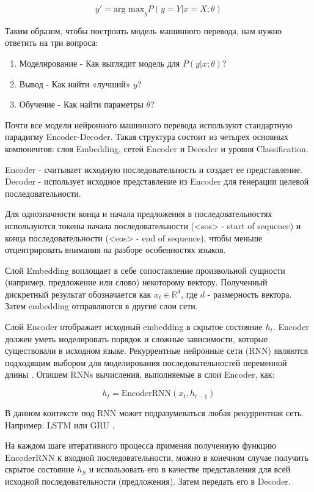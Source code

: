 \documentclass[a4paper,12pt]{article}
\begin{document}
    $$
        y' = \text{arg max}_y P(y = Y | x = X; \theta)
    $$
    
    Таким образом, чтобы построить модель машинного перевода, нам нужно ответить на три вопроса:
    
    \begin{enumerate}
        \item Моделирование - Как выглядит модель для $P(y|x; \theta)$?
        \item Вывод - Как найти «лучший» $y$?
        \item Обучение - Как найти параметры $\theta$?
    \end{enumerate}
    
    Почти все модели нейронного машинного перевода используют стандартную парадигму Encoder-Decoder. Такая структура состоит из четырех основных компонентов: слоя Embedding, сетей Encoder и Decoder и уровня Classification.
    
    Encoder - считывает исходную последовательность и создает ее представление. Decoder - использует исходное представление из Encoder для генерации целевой последовательности.
    
    Для однозначности конца и начала предложения в последовательностях используются токены начала последовательности (<sos> - start of sequence) и конца последовательности (<eos> - end of sequence), чтобы меньше отцентрировать внимания на разборе особенностях языков.
	
	Слой Embedding воплощает в себе сопоставление произвольной сущности (например, предложение или слово) некоторому вектору. Полученный дискретный результат обозначается как $x_t \in \mathbb{R}^d$, где $d$ - размерность вектора. Затем embedding отправляются в другие слои сети.
	
	Слой Encoder отображает исходный embedding в скрытое состояние $h_t$. Encoder должен уметь моделировать порядок и сложные зависимости, которые существовали в исходном языке. Рекуррентные нейронные сети (RNN) являются подходящим выбором для моделирования последовательностей переменной длины \cite{6}. Опишем RNNs вычисления, выполняемые в слои Encoder, как:
	
	$$
	    h_t = \text{EncoderRNN}(x_t, h_{t-1})
	$$
	
	В данном контексте под RNN может подразумеваться любая рекуррентная сеть. Например: LSTM \cite{1} или GRU \cite{2}.

	На каждом шаге итеративного процесса применяя полученную функцию $\text{EncoderRNN}$ к входной последовательности, можно в конечном случае получить скрытое состояние $h_S$ и использовать его в качестве представления для всей исходной последовательности (предложения). Затем передать его в Decoder.
	
\end{document}
